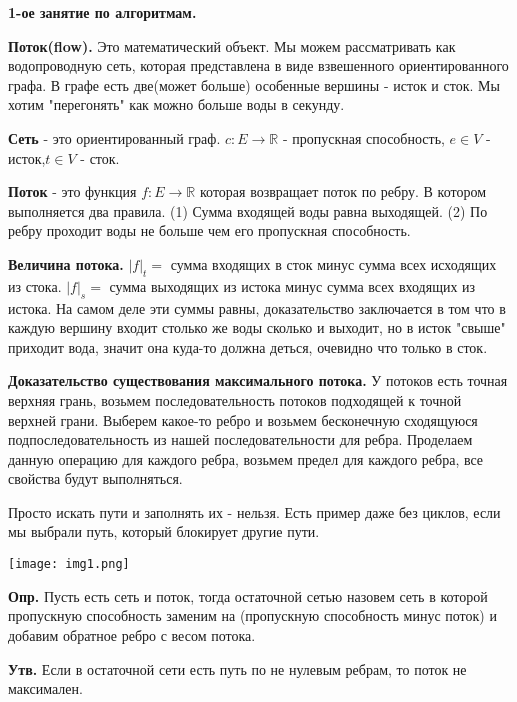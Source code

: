  \begin{center}
  \textbf{1-ое занятие по алгоритмам.} 
 \end{center}

 \textbf{Поток(flow).} Это математический объект. Мы можем рассматривать как водопроводную сеть, которая представлена в виде взвешенного ориентированного графа. В графе есть две(может больше) особенные вершины - исток и сток. Мы хотим "перегонять" как можно больше воды в секунду.

 \textbf{Сеть} - это ориентированный граф. $c: E \to \mathbb{R} $ - пропускная способность, $e \in V$ - исток,\break$t \in V$ - сток.

  \textbf{Поток} - это функция $f: E \to \mathbb{R} $ которая возвращает поток по ребру. В котором выполняется два правила. (1) Сумма входящей воды равна выходящей. (2) По ребру проходит воды не больше чем его пропускная способность.

  \textbf{Величина потока.} $|f|_t = $ сумма входящих в сток минус сумма всех исходящих из стока.  $|f|_s = $ сумма выходящих из истока минус сумма всех входящих из истока. На самом деле эти суммы равны, доказательство заключается в том что в каждую вершину входит столько же воды сколько и выходит, но в исток "свыше" приходит вода, значит она куда-то должна деться, очевидно что только в сток.

\textbf{Доказательство существования максимального потока.} У потоков есть точная верхняя грань, возьмем последовательность потоков подходящей к точной верхней грани. Выберем какое-то ребро и возьмем бесконечную сходящуюся подпоследовательность из нашей последовательности для ребра. Проделаем данную операцию для каждого ребра, возьмем предел для каждого ребра, все свойства будут выполняться.

Просто искать пути и заполнять их - нельзя. Есть пример даже без циклов, если мы выбрали путь, который блокирует другие пути.

\begin{center}
\texttt{[image: img1.png]}
\end{center}

\textbf{Опр.} Пусть есть сеть и поток, тогда остаточной сетью назовем сеть в которой пропускную способность заменим на (пропускную способность минус поток) и добавим обратное ребро с весом потока.

\textbf{Утв.} Если в остаточной сети есть путь по не нулевым ребрам, то поток не максимален.
